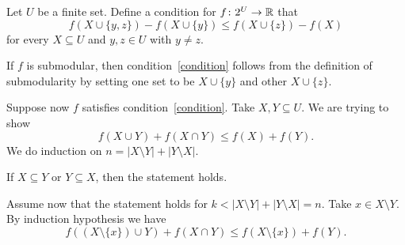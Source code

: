 \newcommand{\sheet}{9}




\maketitle

\begin{exercise}{1}
    
    Let $U$ be a finite set. Define a condition for $f \colon 2^U \to \mathbb{R}$ that
    \begin{equation}\label{condition}
        f(X \cup \{y, z\}) - f(X \cup \{y\}) \leq f(X \cup \{z\}) - f(X)
    \end{equation}
    for every $X \subseteq U$ and $y, z \in U$ with $y \not= z$.

    If $f$ is submodular, then condition~\ref{condition} follows from the
    definition of submodularity by setting one set to be $X \cup \{y\}$ and
    other $X \cup \{z\}$.

    Suppose now $f$ satisfies condition~\ref{condition}.
    Take $X, Y \subseteq U$. We are trying to show
    \begin{equation*}
        f(X \cup Y) + f(X \cap Y) \leq f(X) + f(Y).
    \end{equation*}
    We do induction on $n = |X \setminus Y| + |Y \setminus X|$.

    If $X \subseteq Y$ or $Y \subseteq X$, then the statement holds.

    Assume now that the statement holds for $k < |X \setminus Y| + |Y \setminus
    X| = n$.
    Take $x \in X \setminus Y$. By induction hypothesis we have
    \begin{equation}\label{ineq1}
        f((X \setminus \{x\}) \cup Y) + f(X \cap Y) \leq f(X \setminus \{x\}) + f(Y).
    \end{equation}


\end{exercise}
